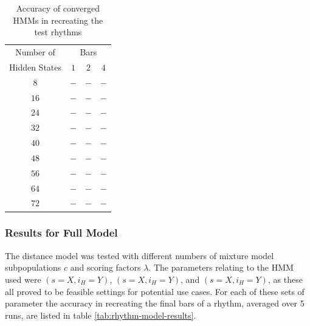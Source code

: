 \documentclass[ author={Stephen Livermore-Tozer},
				supervisor={Dr. Peter Flach},
				degree={MEng},
				title={Algorithmic Co-composition Using Machine Learning},
				subtitle={},
				type={research},
				year={2016} ]{dissertation}
\begin{document}
	\begin{table}[h]
		\begin{center}
			\begin{tabular}{cccc}
				\toprule
				Number of& \multicolumn{3}{c}{Bars}\\
				\cline{2-4}
				Hidden States& $1$ & $2$ & $4$\\
				\hline
				$8$ & $-$ & $-$ & $-$\\
				$16$ & $-$ & $-$ & $-$\\
				$24$ & $-$ & $-$ & $-$\\
				$32$ & $-$ & $-$ & $-$\\
				$40$ & $-$ & $-$ & $-$\\
				$48$ & $-$ & $-$ & $-$\\
				$56$ & $-$ & $-$ & $-$\\
				$64$ & $-$ & $-$ & $-$\\
				$72$ & $-$ & $-$ & $-$\\
				\bottomrule
			\end{tabular}
		\end{center}
		\caption{Accuracy of converged HMMs in recreating the test rhythms}
		\label{tab:hmm-results}
	\end{table}
	
	\subsubsection{Results for Full Model}
	
	The distance model was tested with different numbers of mixture model subpopulations $c$ and scoring factors $\lambda$. The parameters relating to the HMM used were $(s = X, i_H = Y)$, $(s = X, i_H = Y)$, and $(s = X, i_H = Y)$, as these all proved to be feasible settings for potential use cases. For each of these sets of parameter the accuracy in recreating the final bars of a rhythm, averaged over 5 runs, are listed in table \ref{tab:rhythm-model-results}.
	
\end{document}
